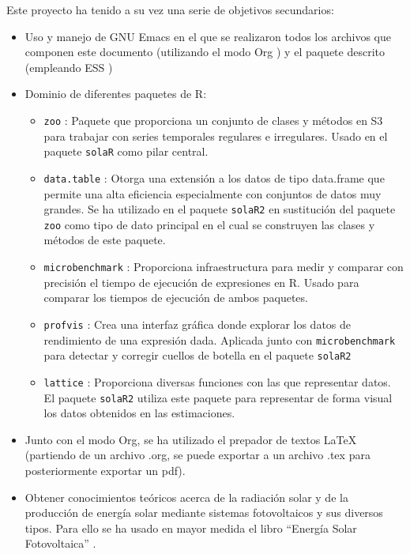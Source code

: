 Este proyecto ha tenido a su vez una serie de objetivos secundarios:
\begin{itemize}
\item Uso y manejo de GNU Emacs \cite{emacs85} en el que se realizaron todos los archivos que componen este documento (utilizando el modo Org \cite{dominik03}) y el paquete descrito (empleando ESS \cite{ess24})
\item Dominio de diferentes paquetes de R:
\begin{itemize}
\item \texttt{zoo} \cite{zeileis05}: Paquete que proporciona un conjunto de clases y métodos en S3 para trabajar con series temporales regulares e irregulares.
Usado en el paquete \texttt{solaR} como pilar central.
\item \texttt{data.table} \cite{barrett24}: Otorga una extensión a los datos de tipo data.frame que permite una alta eficiencia especialmente con conjuntos de datos muy grandes.
Se ha utilizado en el paquete \texttt{solaR2} en sustitución del paquete \texttt{zoo} como tipo de dato principal en el cual se construyen las clases y métodos de este paquete.
\item \texttt{microbenchmark} \cite{mersmann23}: Proporciona infraestructura para medir y comparar con precisión el tiempo de ejecución de expresiones en R.
Usado para comparar los tiempos de ejecución de ambos paquetes.
\item \texttt{profvis} \cite{wickham24}: Crea una interfaz gráfica donde explorar los datos de rendimiento de una expresión dada.
Aplicada junto con \texttt{microbenchmark} para detectar y corregir cuellos de botella en el paquete \texttt{solaR2}
\item \texttt{lattice} \cite{sarkar08}: Proporciona diversas funciones con las que representar datos.
El paquete \texttt{solaR2} utiliza este paquete para representar de forma visual los datos obtenidos en las estimaciones.
\end{itemize}
\item Junto con el modo Org, se ha utilizado el prepador de textos \LaTeX{} (partiendo de un archivo .org, se puede exportar a un archivo .tex para posteriormente exportar un pdf).
\item Obtener conocimientos teóricos acerca de la radiación solar y de la producción de energía solar mediante sistemas fotovoltaicos y sus diversos tipos.
Para ello se ha usado en mayor medida el libro ``Energía Solar Fotovoltaica'' \cite{Perpinan2023}.
\end{itemize}
